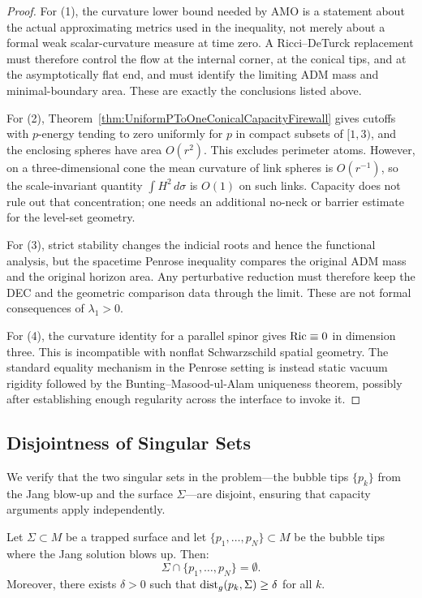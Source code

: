 \begin{proof}
For (1), the curvature lower bound needed by AMO is a statement about the
actual approximating metrics used in the inequality, not merely about a formal
weak scalar-curvature measure at time zero.  A Ricci--DeTurck replacement must
therefore control the flow at the internal corner, at the conical tips, and at
the asymptotically flat end, and must identify the limiting ADM mass and
minimal-boundary area.  These are exactly the conclusions listed above.

For (2), Theorem~\ref{thm:UniformPToOneConicalCapacityFirewall} gives cutoffs
with \(p\)-energy tending to zero uniformly for \(p\) in compact subsets of
\([1,3)\), and the enclosing spheres have area \(O(r^2)\).  This excludes
perimeter atoms.  However, on a three-dimensional cone the mean curvature of
link spheres is \(O(r^{-1})\), so the scale-invariant quantity
\(\int H^2\,d\sigma\) is \(O(1)\) on such links.  Capacity does not rule out
that concentration; one needs an additional no-neck or barrier estimate for
the level-set geometry.

For (3), strict stability changes the indicial roots and hence the functional
analysis, but the spacetime Penrose inequality compares the original ADM mass
and the original horizon area.  Any perturbative reduction must therefore keep
the DEC and the geometric comparison data through the limit.  These are not
formal consequences of \(\lambda_1>0\).

For (4), the curvature identity for a parallel spinor gives
\(\mathrm{Ric}\equiv0\) in dimension three.  This is incompatible with nonflat
Schwarzschild spatial geometry.  The standard equality mechanism in the
Penrose setting is instead static vacuum rigidity followed by the
Bunting--Masood-ul-Alam uniqueness theorem, possibly after establishing enough
regularity across the interface to invoke it.
\end{proof}

\subsection{Disjointness of Singular Sets}
\label{subsec:DisjointSingular}

We verify that the two singular sets in the problem---the bubble tips $\{p_k\}$ from the Jang blow-up and the surface $\Sigma$---are disjoint, ensuring that capacity arguments apply independently.

\begin{theorem}\label{thm:DisjointSingular}
Let $\Sigma \subset M$ be a trapped surface and let $\{p_1, \ldots, p_N\} \subset M$ be the bubble tips where the Jang solution blows up. Then:
\[
    \Sigma \cap \{p_1, \ldots, p_N\} = \emptyset.
\]
Moreover, there exists $\delta > 0$ such that $\mathrm{dist}_g(p_k, \Sigma) \ge \delta$ for all $k$.
\end{theorem}

